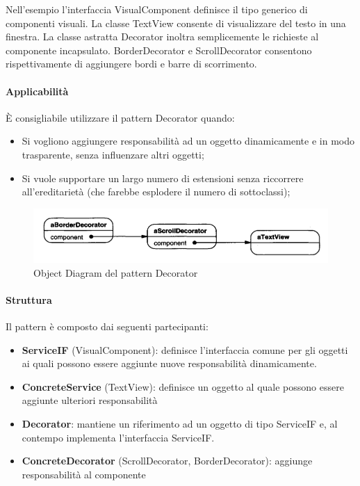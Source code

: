 Nell'esempio l'interfaccia VisualComponent definisce il tipo generico di componenti visuali. La classe TextView consente di visualizzare del testo in una finestra. La classe astratta Decorator inoltra semplicemente le richieste al componente incapsulato. BorderDecorator e ScrollDecorator consentono rispettivamente di aggiungere bordi e barre di scorrimento.

\paragraph{Applicabilità} È consigliabile utilizzare il pattern Decorator quando:
\begin{itemize}
    \item Si vogliono aggiungere responsabilità ad un oggetto dinamicamente e in modo trasparente, senza influenzare altri oggetti;
    \item Si vuole supportare un largo numero di estensioni senza riccorrere all'ereditarietà (che farebbe esplodere il numero di sottoclassi);
\end{itemize}

\begin{figure}[H]
    \centering
    \includegraphics[width=0.75\linewidth]{assets/pattern/decorator/decorator-object-diagram.png}
    \caption{Object Diagram del pattern Decorator}
\end{figure}

\paragraph{Struttura} Il pattern è composto dai seguenti partecipanti:
\begin{itemize}
    \item \textbf{ServiceIF} (VisualComponent): definisce l'interfaccia comune per gli oggetti ai quali possono essere aggiunte nuove responsabilità dinamicamente.
    \item \textbf{ConcreteService} (TextView): definisce un oggetto al quale possono essere aggiunte ulteriori responsabilità
    \item \textbf{Decorator}: mantiene un riferimento ad un oggetto di tipo ServiceIF e, al contempo implementa l'interfaccia ServiceIF.
    \item \textbf{ConcreteDecorator} (ScrollDecorator, BorderDecorator): aggiunge responsabilità al componente
\end{itemize}

